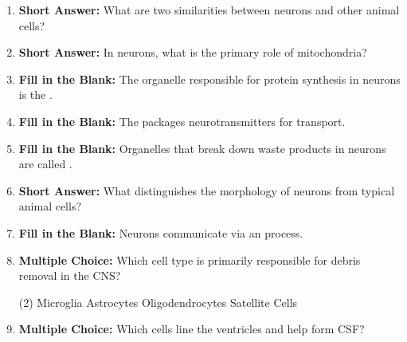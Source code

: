 \begin{enumerate}[label=\textbf{Q2.1.\arabic*}]
      \item \textbf{Short Answer:} What are two similarities between neurons and other animal cells? \\
      \item \textbf{Short Answer:} In neurons, what is the primary role of mitochondria? \\
      \item \textbf{Fill in the Blank:} The organelle responsible for protein synthesis in neurons is the \underline{\hspace{3cm}}. \\
      \item \textbf{Fill in the Blank:} The \underline{\hspace{3cm}} packages neurotransmitters for transport. \\
      \item \textbf{Fill in the Blank:} Organelles that break down waste products in neurons are called \underline{\hspace{3cm}}. \\
      \item \textbf{Short Answer:} What distinguishes the morphology of neurons from typical animal cells? \\
      \item \textbf{Fill in the Blank:} Neurons communicate via an \underline{\hspace{3cm}} process. \\
      \item \textbf{Multiple Choice:} Which cell type is primarily responsible for debris removal in the CNS?
            \begin{tasks}[label=\textcolor{\documentTheme}{(\Alph*)}, item-format=\color{\documentTheme}, label-width=1.5em, item-indent=1.7em](2)
                  \task Microglia
                  \task Astrocytes
                  \task Oligodendrocytes
                  \task Satellite Cells
            \end{tasks}
      \item \textbf{Multiple Choice:} Which cells line the ventricles and help form CSF?

\end{enumerate}
